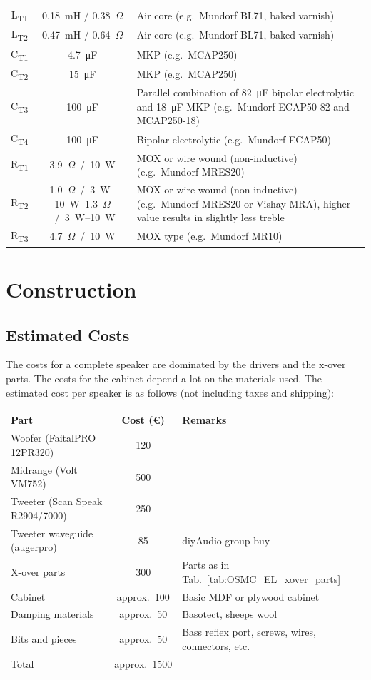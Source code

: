 \documentclass[12pt,a4paper]{article}
\providecommand{\tabl}[1]{Tab.~\ref{tab:#1}}
\providecommand{\inductor}[1]{L\textsubscript{#1}}
\providecommand{\capacitor}[1]{C\textsubscript{#1}}
\providecommand{\resistor}[1]{R\textsubscript{#1}}
\providecommand{\Ohm}{$\Omega$}
\begin{document}
\begin{table}[p]
\begin{tabular}{ccp{}}
\inductor{T1}	& \SI{0.18}{mH} / \SI{0.38}{\Ohm}	& Air core (e.g.~Mundorf BL71, baked varnish)\\
\inductor{T2}	& \SI{0.47}{mH} / \SI{0.64}{\Ohm}	& Air core (e.g.~Mundorf BL71, baked varnish)\\
\capacitor{T1}	& \SI{4.7}{\micro F}			& MKP (e.g.~MCAP250)\\
\capacitor{T2}	& \SI{15}{\micro F}			& MKP (e.g.~MCAP250)\\
\capacitor{T3}	& \SI{100}{\micro F}			& Parallel combination of \SI{82}{\micro F} bipolar electrolytic and \SI{18}{\micro F} MKP (e.g.~Mundorf ECAP50-82 and MCAP250-18)\\
\capacitor{T4}	& \SI{100}{\micro F}			& Bipolar electrolytic (e.g.~Mundorf ECAP50)\\
\resistor{T1}	& \SI{3.9}{\Ohm} / \SI{10}{W}		& MOX or wire wound (non-inductive) (e.g.~Mundorf MRES20)\\
\resistor{T2}	& \SIrange{1.0}{1.3}{\Ohm} / \SIrange{3}{10}{W}		& MOX or wire wound (non-inductive) (e.g.~Mundorf MRES20 or Vishay MRA), higher value results in slightly less treble\cite{osmc_p1164}\\
\resistor{T3}	& \SI{4.7}{\Ohm} / \SI{10}{W}		& MOX type (e.g.~Mundorf MR10)\\
\bottomrule
\end{tabular}
\end{table}



\section{Construction}

\subsection{Estimated Costs}
The costs for a complete speaker are dominated by the drivers and the x-over parts. The costs for the cabinet depend a lot on the materials used. The estimated cost per speaker is as follows (not including taxes and shipping):

\begin{tabular}{lcp{}} 
\toprule
Part & Cost (\euro) & Remarks\\ 
\midrule 
Woofer (FaitalPRO 12PR320)	&	120	\\
Midrange (Volt VM752)		&	500 \\
Tweeter (Scan Speak R2904/7000)	&	250	\\
Tweeter waveguide (augerpro)	&	85	& diyAudio group buy\cite{augerpro_groupbuy} \\
X-over parts			&	300	& Parts as in \tabl{OSMC_EL_xover_parts} \\
Cabinet				&	approx.~100	& Basic MDF or plywood cabinet \\
Damping materials		&	approx.~50	& Basotect, sheeps wool \\
Bits and pieces			&	approx.~50 	& Bass reflex port, screws, wires, connectors, etc. \\
\midrule 
Total				&	approx.~1500 \\
\bottomrule
\end{tabular}
\end{document}

